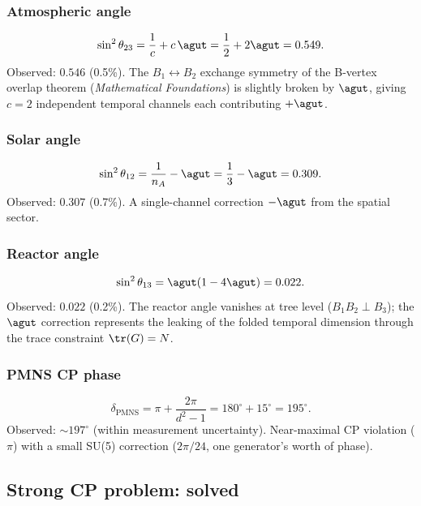\subsubsection{Atmospheric angle}
\begin{equation}
\sin^2\theta_{23} = \frac{1}{c} + c\,\agut = \frac{1}{2} + 2\agut = 0.549.
\end{equation}
Observed: $0.546$ (0.5\%). The $B_1 \leftrightarrow B_2$ exchange symmetry of the B-vertex overlap theorem (\textit{Mathematical Foundations}) is slightly broken by $\agut$, giving $c = 2$ independent temporal channels each contributing $+\agut$.

\subsubsection{Solar angle}
\begin{equation}
\sin^2\theta_{12} = \frac{1}{n_A} - \agut = \frac{1}{3} - \agut = 0.309.
\end{equation}
Observed: $0.307$ (0.7\%). A single-channel correction $-\agut$ from the spatial sector.

\subsubsection{Reactor angle}
\begin{equation}
\sin^2\theta_{13} = \agut(1 - 4\agut) = 0.022.
\end{equation}
Observed: $0.022$ (0.2\%). The reactor angle vanishes at tree level ($B_1 B_2 \perp B_3$); the $\agut$ correction represents the leaking of the folded temporal dimension through the trace constraint $\tr(G) = N$.

\subsubsection{PMNS CP phase}
\begin{equation}
\delta_\text{PMNS} = \pi + \frac{2\pi}{d^2 - 1} = 180^\circ + 15^\circ = 195^\circ.
\end{equation}
Observed: $\sim 197^\circ$ (within measurement uncertainty). Near-maximal CP violation ($\pi$) with a small SU(5) correction ($2\pi/24$, one generator's worth of phase).

\subsection{Strong CP problem: solved}

